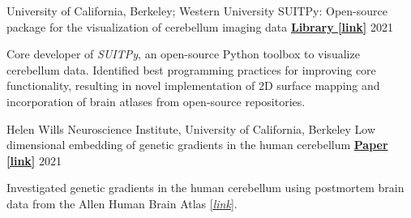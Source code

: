 
\begin{cventries}
    
  \cventry
  	{University of California, Berkeley; Western University}
  	{SUITPy: Open-source package for the visualization of cerebellum imaging data} %
  	{\href{https://suitpy.readthedocs.io/en/latest/}{\textbf{Library [link]}}}
  	{2021} %
    {
      \begin{cvitems} %
      	\item {Core developer of \textit{SUITPy}, an open-source Python toolbox to visualize cerebellum data. Identified best programming practices for improving core functionality, resulting in novel implementation of 2D surface mapping and incorporation of brain atlases from open-source repositories.}
      \end{cvitems}
    }
    
  \cventry
  	{Helen Wills Neuroscience Institute, University of California, Berkeley}
    {Low dimensional embedding of genetic gradients in the human cerebellum} %
    {\href{https://papers.ssrn.com/sol3/papers.cfm?abstract_id=3797269}{\textbf{Paper [link]}}}
    {2021} %
    {
      \begin{cvitems} %
      	\item {Investigated genetic gradients in the human cerebellum using postmortem brain data from the Allen Human Brain Atlas \href{https://human.brain-map.org/}{[\textit{link}}].} 			
      \end{cvitems}
    }
    

\end{cventries}
